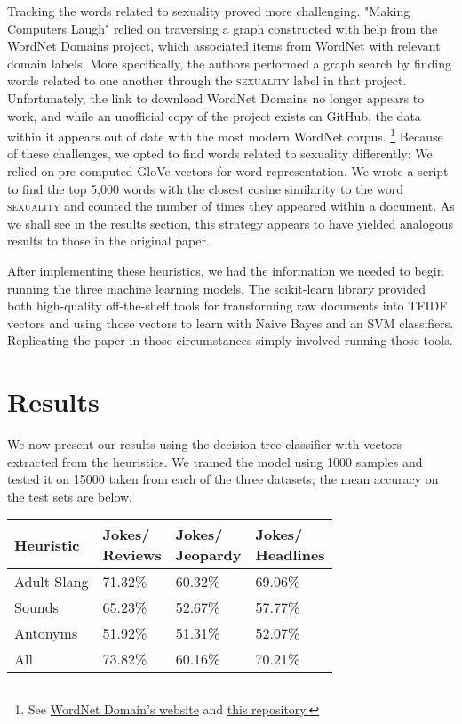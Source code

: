 \documentclass[11pt,a4paper]{article}
\begin{document}
Tracking the words related to sexuality proved more challenging. "Making Computers Laugh" relied on traversing a graph constructed with help from the WordNet Domains project, which associated items from WordNet with relevant domain labels. More specifically, the authors performed a graph search by finding words related to one another through the \textsc{sexuality} label in that project. Unfortunately, the link to download WordNet Domains no longer appears to work, and while an unofficial copy of the project exists on GitHub, the data within it appears out of date with the most modern WordNet corpus. \footnote{See \href{https://wndomains.fbk.eu}{WordNet Domain's website} and \href{https://github.com/larsmans/wordnet-domains-sentiwords}{this repository.}} Because of these challenges, we opted to find words related to sexuality differently: We relied on pre-computed GloVe vectors for word representation. \cite{pennington-etal-2014-glove} We wrote a script to find the top 5,000 words with the closest cosine similarity to the word \textsc{sexuality} and counted the number of times they appeared within a document. As we shall see in the results section, this strategy appears to have yielded analogous results to those in the original paper.

After implementing these heuristics, we had the information we needed to begin running the three machine learning models. The scikit-learn library provided both high-quality off-the-shelf tools for transforming raw documents into TFIDF vectors and using those vectors to learn with Naive Bayes and an SVM classifiers. \cite{sklearn_api} Replicating the paper in those circumstances simply involved running those tools.

\section{Results}

We now present our results using the decision tree classifier with vectors extracted from the heuristics. We trained the model using 1000 samples and tested it on 15000 taken from each of the three datasets; the mean accuracy on the test sets are below.

\begin{center}
  \begin{tabular}{|p{1.5cm}|p{1.5cm}|p{1.5cm}|p{1.5cm}|}
    \hline
    Heuristic & \thead{Jokes/ \\ Reviews} & \thead{Jokes/ \\ Jeopardy} & \thead{Jokes/ \\ Headlines} \\
    \hline
    Adult Slang & 71.32\% & 60.32\% & 69.06\% \\
    \hline
    Sounds & 65.23\% & 52.67\% & 57.77\% \\
    \hline
    Antonyms & 51.92\% & 51.31\% & 52.07\% \\
    \hline
    All & 73.82\% & 60.16\% & 70.21\% \\
    \hline
\end{tabular}
\end{center}
\end{document}
